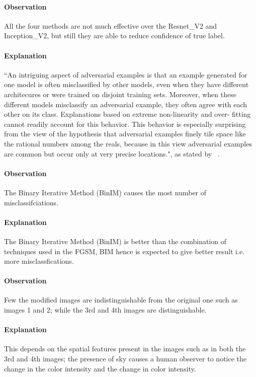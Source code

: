 \documentclass[letterpaper]{article} %
\begin{document}
\paragraph{Observation} All the four methods are not much effective over the Resnet\_V2 and Inception\_V2, but still they are able to reduce confidence of true label.
\paragraph{Explanation}``An intriguing aspect of adversarial examples is that an example generated for one model is often misclassified by other models, even when they have different architecures or were trained on disjoint training sets. Moreover, when these different models misclassify an adversarial example, they often agree with each other on its class.   Explanations based on extreme non-linearity and over-
fitting cannot readily account for this behavior. This behavior is especially surprising from the view of the hypothesis that adversarial examples finely tile space like the rational numbers among the reals, because in this view adversarial examples are common but
occur only at very precise locations.", as stated by  ~\cite{goodfellow2014explaining}.

\paragraph{Observation} The Binary Iterative Method (BinIM) causes the most number of misclassifciations.
\paragraph{Explanation} The Binary Iterative Method (BinIM) is better than the combination of techniques used in the FGSM, BIM hence is expected to give better result i.e. more misclassfications.



\paragraph{Observation} Few the modified images are indistinguishable from the original one such as images 1 and 2; while the 3rd and 4th images are distinguishable.


\paragraph{Explanation} This depends on the spatial features present in the images such as in both the 3rd and 4th images; the presence of sky causes a human observer to notice the change in the color intensity and the change in color intensity.
\end{document}
